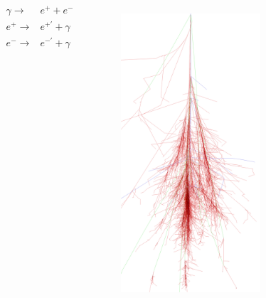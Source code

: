 \documentclass[aspectratio=1610, professionalfonts, 9pt]{beamer}
\begin{document}
\begin{frame}
\begin{columns}[onlytextwidth]
\begin{figure}
	\end{figure}
	\begin{eqnarray*}
	  \gamma \rightarrow& e^{+} + e^{-} \\
	  e^{+} \rightarrow& e^{+'} + \gamma \\
	  e^{-} \rightarrow& e^{-'} + \gamma 
	\end{eqnarray*}
	\begin{figure}
	  \centering
	  \includegraphics[width=\textwidth]{./images/proton_100GeV.png} \\

\end{figure}
\end{columns}
\end{frame}
\end{document}
